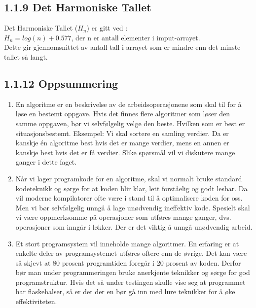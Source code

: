 \documentclass[11pt]{article}
\begin{document}
    \subsection{1.1.9 Det Harmoniske Tallet}
        Det Harmoniske Tallet ($H_n$) er gitt ved : \\
        $H_n = log(n) + 0.577$, der n er antall elementer i imput-arrayet. \\
        Dette gir gjennomsnittet av antall tall i arrayet som er mindre enn det minste tallet så langt.

    \subsection{1.1.12 Oppsummering}
        \begin{enumerate}
            \item En algoritme er en beskrivelse av de arbeidsoperasjonene som skal til for å løse en
                bestemt oppgave. Hvis det finnes flere algoritmer som løser den samme oppgaven, bør
                vi selvfølgelig velge den beste. Hvilken som er best er situasjonsbestemt. Eksempel:
                Vi skal sortere en samling verdier. Da er kanskje én algoritme best hvis det er mange
                verdier, mens en annen er kanskje best hvis det er få verdier. Slike spørsmål vil vi
                diskutere mange ganger i dette faget.
            \item Når vi lager programkode for en algoritme, skal vi normalt bruke standard kodeteknikk
                og sørge for at koden blir klar, lett forståelig og godt lesbar. Da vil moderne
                kompilatorer ofte være i stand til å optimalisere koden for oss. Men vi bør selvfølgelig
                unngå å lage unødvendig ineffektiv kode. Spesielt skal vi være oppmerksomme på
                operasjoner som utføres mange ganger, dvs. operasjoner som inngår i løkker. Der er
                det viktig å unngå unødvendig arbeid.
            \item Et stort programsystem vil inneholde mange algoritmer. En erfaring er at enkelte deler
                av programsystemet utføres oftere enn de øvrige. Det kan være så skjevt at 80 prosent
                programtiden foregår i 20 prosent av koden. Derfor bør man under programmeringen
                bruke anerkjente teknikker og sørge for god programstruktur. Hvis det så under
                testingen skulle vise seg at programmet har flaskehalser, så er det der en bør gå inn
                med lure teknikker for å øke effektiviteten.
        \end{enumerate}
\end{document}
